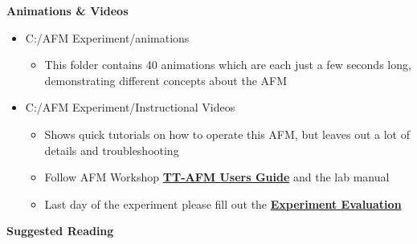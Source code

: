 \documentclass{../lab}
\begin{document}
\noindent\textbf{Animations \& Videos}

\begin{itemize}
    \item C:/AFM Experiment/animations

    \begin{itemize}
        \item This folder contains 40 animations which are each just a few seconds long, demonstrating different concepts about the AFM

    \end{itemize}

    \item C:/AFM Experiment/Instructional Videos

    \begin{itemize}
        \item Shows quick tutorials on how to operate this AFM, but leaves out a lot of details and troubleshooting

        \item Follow AFM Workshop \href{http://experimentationlab.berkeley.edu/tt-afmuserguidev2.2}{\textbf{TT-AFM Users Guide}} and the  lab manual

        \item Last day of the experiment please fill out the \href{\ExperimentEvaluation}{\textbf{Experiment Evaluation}}

    \end{itemize}

\end{itemize}

\noindent\textbf{Suggested Reading}
\end{document}
